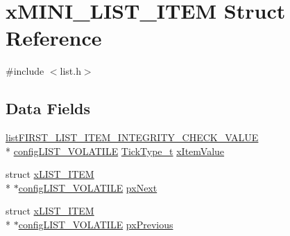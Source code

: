 \hypertarget{structxMINI__LIST__ITEM}{\section{x\-M\-I\-N\-I\-\_\-\-L\-I\-S\-T\-\_\-\-I\-T\-E\-M Struct Reference}
\label{structxMINI__LIST__ITEM}
}


{\ttfamily \#include $<$list.\-h$>$}

\subsection*{Data Fields}
\begin{DoxyCompactItemize}
\item 
\hyperlink{list_8h_a3611bd5d5d87cb26ac1dc7a4852b94a0}{list\-F\-I\-R\-S\-T\-\_\-\-L\-I\-S\-T\-\_\-\-I\-T\-E\-M\-\_\-\-I\-N\-T\-E\-G\-R\-I\-T\-Y\-\_\-\-C\-H\-E\-C\-K\-\_\-\-V\-A\-L\-U\-E} \\*
\hyperlink{list_8h_a2d5de557c5561c8980d1bf51d87d8cba}{config\-L\-I\-S\-T\-\_\-\-V\-O\-L\-A\-T\-I\-L\-E} \hyperlink{Flsh186_2prtmacro_8h_aa69c48c6e902ce54f70886e6573c92a9}{Tick\-Type\-\_\-t} \hyperlink{structxMINI__LIST__ITEM_aae79c54ac1efa30959e68604cc23b29e}{x\-Item\-Value}
\item 
struct \hyperlink{structxLIST__ITEM}{x\-L\-I\-S\-T\-\_\-\-I\-T\-E\-M} \\*
$\ast$\hyperlink{list_8h_a2d5de557c5561c8980d1bf51d87d8cba}{config\-L\-I\-S\-T\-\_\-\-V\-O\-L\-A\-T\-I\-L\-E} \hyperlink{structxMINI__LIST__ITEM_aa7ae770b0f10daeb9ac76c6f7dd5608e}{px\-Next}
\item 
struct \hyperlink{structxLIST__ITEM}{x\-L\-I\-S\-T\-\_\-\-I\-T\-E\-M} \\*
$\ast$\hyperlink{list_8h_a2d5de557c5561c8980d1bf51d87d8cba}{config\-L\-I\-S\-T\-\_\-\-V\-O\-L\-A\-T\-I\-L\-E} \hyperlink{structxMINI__LIST__ITEM_a732c666bb97560eb1b094a2c411269ab}{px\-Previous}
\end{DoxyCompactItemize}


